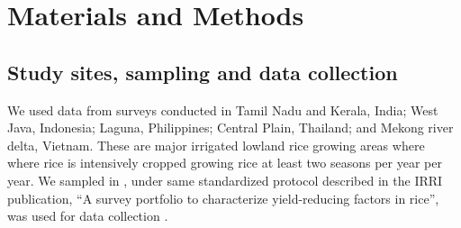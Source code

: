 \section*{Materials and Methods}

\subsection*{Study sites, sampling and data collection}
We used data from surveys conducted in Tamil Nadu and Kerala, India; West Java, Indonesia; Laguna, Philippines; Central Plain, Thailand; and Mekong river delta, Vietnam. These are major irrigated lowland rice growing areas where where rice is intensively cropped growing rice at least two seasons per year per year. We sampled in , under same standardized protocol described in the IRRI publication, ``A survey portfolio to characterize yield-reducing factors in rice'', was used for data collection \cite{Savarysurvey2009}.
